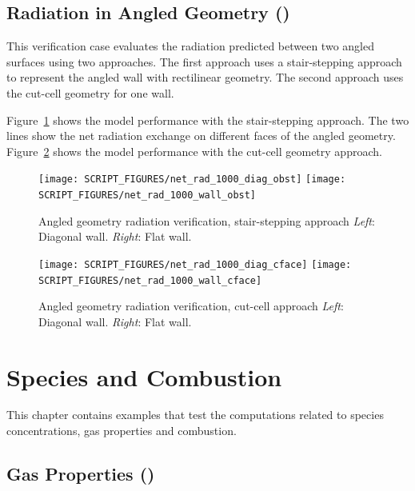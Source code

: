 \documentclass[11pt]{book}
\begin{document}
\section{Radiation in Angled Geometry (\texorpdfstring{}{net\_rad\_1000}) }
\label{net_rad_1000}

This verification case evaluates the radiation predicted between two angled surfaces using two approaches.
The first approach uses a stair-stepping approach to represent the angled wall with rectilinear geometry.
The second approach uses the cut-cell geometry for one wall.

Figure~\ref{net_rad_1000_obst} shows the model performance with the stair-stepping approach.
The two lines show the net radiation exchange on different faces of the angled geometry.
Figure~\ref{net_rad_1000_cface} shows the model performance with the cut-cell geometry approach.

\begin{figure}[ht]
\centering
\texttt{[image: SCRIPT\_FIGURES/net\_rad\_1000\_diag\_obst]}
\texttt{[image: SCRIPT\_FIGURES/net\_rad\_1000\_wall\_obst]}
\caption[The  case]{Angled geometry radiation verification, stair-stepping approach \emph{Left}: Diagonal wall.  \emph{Right}: Flat wall.}
\label{net_rad_1000_obst}
\end{figure}

\begin{figure}[ht]
\centering
\texttt{[image: SCRIPT\_FIGURES/net\_rad\_1000\_diag\_cface]}
\texttt{[image: SCRIPT\_FIGURES/net\_rad\_1000\_wall\_cface]}
\caption[The  case]{Angled geometry radiation verification, cut-cell approach \emph{Left}: Diagonal wall.  \emph{Right}: Flat wall.}
\label{net_rad_1000_cface}
\end{figure}


\chapter{Species and Combustion}

This chapter contains examples that test the computations related to species concentrations, gas properties and combustion.

\section{Gas Properties (\texorpdfstring{}{species\_props})}
\label{gas_properties}
\label{species_props}
\end{document}
